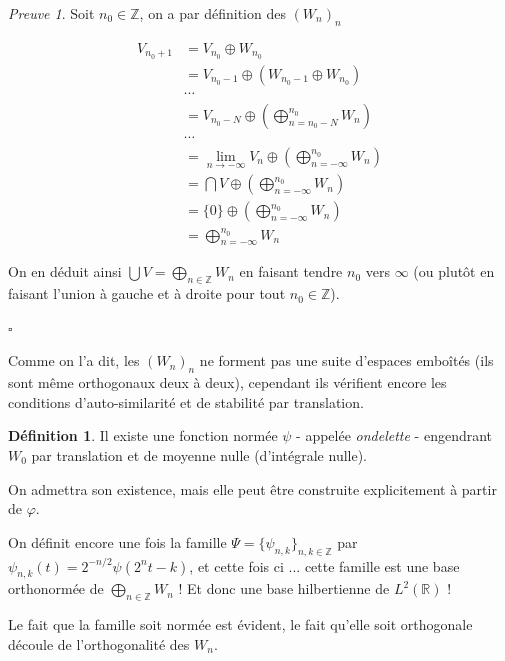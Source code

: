 \documentclass[]{article}
\theoremstyle{remark}
\newtheorem{myproof}{Preuve}
\theoremstyle{definition}
\newtheorem{mydef}{Définition}
\newcommand{\cqfd}{
	\hfill$\square$
}
\newcommand{\DS}{\displaystyle}
\begin{document}
	\begin{myproof}
		Soit $n_0 \in \mathbb{Z}$, on a par définition des $(W_{n})_n$
		
		\begin{align*}
			V_{n_0+1} &= V_{n_0} \oplus W_{n_0} \\
			&= V_{n_0 - 1} \oplus \left(W_{n_0 - 1} \oplus W_{n_0} \right) \\
			& \cdots \\
			&= V_{n_0 - N} \oplus \left(\bigoplus_{n = n_0 - N}^{n_0} W_n \right) \\
			& \cdots \\
			&= \lim\limits_{n \to -\infty} V_n \oplus \left(\bigoplus_{n = - \infty}^{n_0} W_n \right) \\
			&= \bigcap V \oplus \left(\bigoplus_{n = - \infty}^{n_0} W_n \right) \\
			&= \{0\} \oplus \left(\bigoplus_{n = - \infty}^{n_0} W_n \right) \\
			&= \bigoplus_{n = - \infty}^{n_0} W_n
		\end{align*}
		
		On en déduit ainsi $\DS \bigcup V = \bigoplus_{n \in \mathbb{Z}} W_n$ en faisant tendre $n_0$ vers $\infty$ (ou plutôt en faisant l'union à gauche et à droite pour tout $n_0 \in \mathbb{Z}$).
		
		\cqfd
	\end{myproof}
	
	Comme on l'a dit, les $(W_n)_n$ ne forment pas une suite d'espaces emboîtés (ils sont même orthogonaux deux à deux), cependant ils vérifient encore les conditions d'auto-similarité et de stabilité par translation.

	\begin{mydef}
		Il existe une fonction normée $\psi$ - appelée \textit{ondelette} - engendrant $W_0$ par translation et de moyenne nulle (d'intégrale nulle).
		
		On admettra son existence, mais elle peut être construite explicitement à partir de $\varphi$.
	\end{mydef}
		
	On définit encore une fois la famille $\Psi = \{\psi_{n, k}\}_{n, k \in \mathbb{Z}}$ par $\psi_{n, k}(t) = 2^{-n/2} \psi(2^{n} t - k)$, et cette fois ci ... cette famille est une base orthonormée de $\DS \bigoplus_{n \in \mathbb{Z}} W_n$ ! Et donc une base hilbertienne de $L^2(\mathbb{R})$ !
	
	Le fait que la famille soit normée est évident, le fait qu'elle soit orthogonale découle de l'orthogonalité des $W_n$.
	
\end{document}
